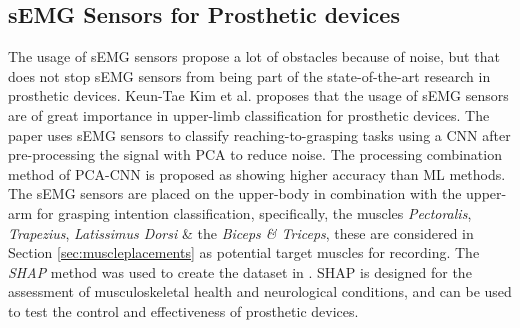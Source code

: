 \documentclass[../main.tex]{subfiles}
\begin{document}
\subsection{sEMG Sensors for Prosthetic devices}

The usage of sEMG sensors propose a lot of obstacles because of noise, but that does not stop sEMG sensors from being part of the state-of-the-art research in prosthetic devices.
Keun-Tae Kim et al. \cite{KeunTaeKim2021} proposes that the usage of sEMG sensors are of great importance in upper-limb classification for prosthetic devices.
The paper uses sEMG sensors to classify reaching-to-grasping tasks using a \gls{CNN} after pre-processing the signal with \gls{PCA} to reduce noise.
The processing combination method of PCA-CNN is proposed as showing higher accuracy than \gls{ML} methods.
The sEMG sensors are placed on the upper-body in combination with the upper-arm for grasping intention classification, specifically, the muscles \textit{Pectoralis}, \textit{Trapezius}, \textit{Latissimus Dorsi} \& the \textit{Biceps \& Triceps}, these are considered in Section \ref{sec:muscleplacements} as potential target muscles for recording.
The \textit{\gls{SHAP}} \cite{shap} method was used to create the dataset in \cite{KeunTaeKim2021}.
\gls{SHAP} is designed for the assessment of musculoskeletal health and neurological conditions, and can be used to test the control and effectiveness of prosthetic devices.
\end{document}

